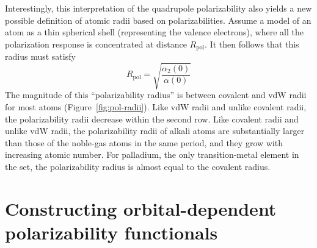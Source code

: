 Interestingly, this interpretation of the quadrupole polarizability also yields a new possible definition of atomic radii based on polarizabilities.
Assume a model of an atom as a thin spherical shell (representing the valence electrons), where all the polarization response is concentrated at distance $R_\text{pol}$.
It then follows that this radius must satisfy
\begin{equation}
  R_\text{pol}=\sqrt{\frac{\alpha_2(0)}{\alpha(0)}}
  \label{eq:pol-radius}
\end{equation}
The magnitude of this ``polarizability radius'' is between covalent and vdW radii for most atoms (Figure~\ref{fig:pol-radii}).
Like vdW radii and unlike covalent radii, the polarizability radii decrease within the second row.
Like covalent radii and unlike vdW radii, the polarizability radii of alkali atoms are substantially larger than those of the noble-gas atoms in the same period, and they grow with increasing atomic number.
For palladium, the only transition-metal element in the set, the polarizability radius is almost equal to the covalent radius.

\section{Constructing orbital-dependent polarizability functionals}\label{sec:new-functionals}

